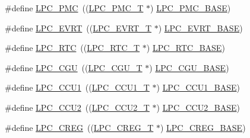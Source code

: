 \begin{DoxyCompactItemize}
\item 
\#define \hyperlink{group___p_e_r_i_p_h__43_x_x___b_a_s_e_ga57d17d4e060482184443625602b43b7d}{L\+P\+C\+\_\+\+P\+MC}~((\hyperlink{struct_l_p_c___p_m_c___t}{L\+P\+C\+\_\+\+P\+M\+C\+\_\+T}              $\ast$) \hyperlink{group___p_e_r_i_p_h__43_x_x___b_a_s_e_gad729bfbe3e327b259732dd0817d6e34b}{L\+P\+C\+\_\+\+P\+M\+C\+\_\+\+B\+A\+SE})
\item 
\#define \hyperlink{group___p_e_r_i_p_h__43_x_x___b_a_s_e_gaaf88f3cc7e8fe79bf75ead9e481ce650}{L\+P\+C\+\_\+\+E\+V\+RT}~((\hyperlink{struct_l_p_c___e_v_r_t___t}{L\+P\+C\+\_\+\+E\+V\+R\+T\+\_\+T}             $\ast$) \hyperlink{group___p_e_r_i_p_h__43_x_x___b_a_s_e_ga921b2ba31c8defad6d1c44ca9406e893}{L\+P\+C\+\_\+\+E\+V\+R\+T\+\_\+\+B\+A\+SE})
\item 
\#define \hyperlink{group___p_e_r_i_p_h__43_x_x___b_a_s_e_ga8303d3e5135b2a039f0dc5f93c194f78}{L\+P\+C\+\_\+\+R\+TC}~((\hyperlink{struct_l_p_c___r_t_c___t}{L\+P\+C\+\_\+\+R\+T\+C\+\_\+T}              $\ast$) \hyperlink{group___p_e_r_i_p_h__43_x_x___b_a_s_e_ga4618213cf968f8245814d7d3e7aa2e2e}{L\+P\+C\+\_\+\+R\+T\+C\+\_\+\+B\+A\+SE})
\item 
\#define \hyperlink{group___p_e_r_i_p_h__43_x_x___b_a_s_e_ga38d60a5a3029e4ebc3c5ffcd856a828d}{L\+P\+C\+\_\+\+C\+GU}~((\hyperlink{struct_l_p_c___c_g_u___t}{L\+P\+C\+\_\+\+C\+G\+U\+\_\+T}              $\ast$) \hyperlink{group___p_e_r_i_p_h__43_x_x___b_a_s_e_ga560da3a74764a9e89bef655f3daa8b0e}{L\+P\+C\+\_\+\+C\+G\+U\+\_\+\+B\+A\+SE})
\item 
\#define \hyperlink{group___p_e_r_i_p_h__43_x_x___b_a_s_e_ga7af049d852c4cd543c025d95b1237ddd}{L\+P\+C\+\_\+\+C\+C\+U1}~((\hyperlink{struct_l_p_c___c_c_u1___t}{L\+P\+C\+\_\+\+C\+C\+U1\+\_\+T}             $\ast$) \hyperlink{group___p_e_r_i_p_h__43_x_x___b_a_s_e_gaf7df220ef74f9e793259c495db5e5956}{L\+P\+C\+\_\+\+C\+C\+U1\+\_\+\+B\+A\+SE})
\item 
\#define \hyperlink{group___p_e_r_i_p_h__43_x_x___b_a_s_e_ga8e34c6693a17476d7e908fff3b9b6052}{L\+P\+C\+\_\+\+C\+C\+U2}~((\hyperlink{struct_l_p_c___c_c_u2___t}{L\+P\+C\+\_\+\+C\+C\+U2\+\_\+T}             $\ast$) \hyperlink{group___p_e_r_i_p_h__43_x_x___b_a_s_e_gab3b7e06c5e7e1913c555e584e2092f21}{L\+P\+C\+\_\+\+C\+C\+U2\+\_\+\+B\+A\+SE})
\item 
\#define \hyperlink{group___p_e_r_i_p_h__43_x_x___b_a_s_e_gae0cf72a5b1a46bb8d426837a1d38804a}{L\+P\+C\+\_\+\+C\+R\+EG}~((\hyperlink{struct_l_p_c___c_r_e_g___t}{L\+P\+C\+\_\+\+C\+R\+E\+G\+\_\+T}             $\ast$) \hyperlink{group___p_e_r_i_p_h__43_x_x___b_a_s_e_ga862ac15bfc87b2a8525acacccedfba61}{L\+P\+C\+\_\+\+C\+R\+E\+G\+\_\+\+B\+A\+SE})

\end{DoxyCompactItemize}
